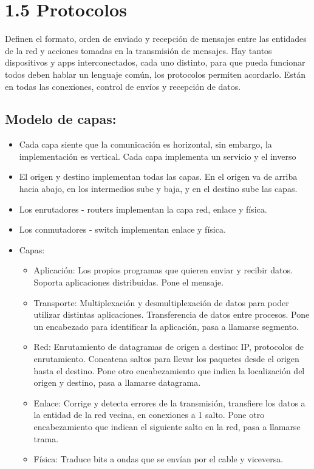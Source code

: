\documentclass[12pt, twoside, openright]{report} %
\begin{document}
\section{1.5 Protocolos}

Definen el formato, orden de enviado y recepción de mensajes entre las
entidades de la red y acciones tomadas en la transmisión de mensajes.
Hay tantos dispositivos y apps interconectados, cada uno distinto, para
que pueda funcionar todos deben hablar un lenguaje común, los protocolos
permiten acordarlo. Están en todas las conexiones, control de envíos y
recepción de datos.

\subsection{Modelo de capas:}

\begin{itemize}
	\item Cada capa siente que la comunicación es horizontal, sin embargo, la
	      implementación es vertical. Cada capa implementa un servicio y el
	      inverso
	\item El origen y destino implementan todas las capas. En el origen va de
	      arriba hacia abajo, en los intermedios sube y baja, y en el destino
	      sube las capas.
	\item Los enrutadores - routers implementan la capa red, enlace y física.
	\item Los conmutadores - switch implementan enlace y física.
	      \pagebreak
	\item Capas:

	      \begin{itemize}
		      \item Aplicación: Los propios programas que quieren enviar y recibir
		            datos. Soporta aplicaciones distribuidas. Pone el mensaje.
		      \item Transporte: Multiplexación y desmultiplexación de datos para poder
		            utilizar distintas aplicaciones. Transferencia de datos entre
		            procesos. Pone un encabezado para identificar la aplicación, pasa a
		            llamarse segmento.
		      \item Red: Enrutamiento de datagramas de origen a destino: IP, protocolos
		            de enrutamiento. Concatena saltos para llevar los paquetes desde el
		            origen hasta el destino. Pone otro encabezamiento que indica la
		            localización del origen y destino, pasa a llamarse datagrama.
		      \item Enlace: Corrige y detecta errores de la transmisión, transfiere los
		            datos a la entidad de la red vecina, en conexiones a 1 salto. Pone
		            otro encabezamiento que indican el siguiente salto en la red, pasa a
		            llamarse trama.
		      \item Física: Traduce bits a ondas que se envían por el cable y viceversa.
	      \end{itemize}

\end{itemize}
\end{document}
